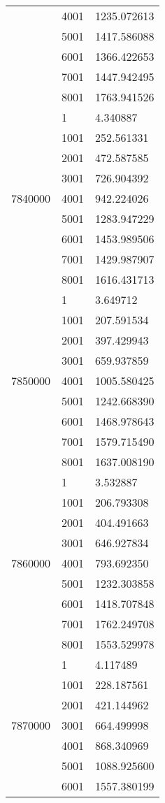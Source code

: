 \begin{table}[htb!]
\begin{tabular}{lll}
 & 4001 & 1235.072613 \\
 & 5001 & 1417.586088 \\
 & 6001 & 1366.422653 \\
 & 7001 & 1447.942495 \\
 & 8001 & 1763.941526 \\
\multirow[c]{9}{*}{7840000} & 1 & 4.340887 \\
 & 1001 & 252.561331 \\
 & 2001 & 472.587585 \\
 & 3001 & 726.904392 \\
 & 4001 & 942.224026 \\
 & 5001 & 1283.947229 \\
 & 6001 & 1453.989506 \\
 & 7001 & 1429.987907 \\
 & 8001 & 1616.431713 \\
\multirow[c]{9}{*}{7850000} & 1 & 3.649712 \\
 & 1001 & 207.591534 \\
 & 2001 & 397.429943 \\
 & 3001 & 659.937859 \\
 & 4001 & 1005.580425 \\
 & 5001 & 1242.668390 \\
 & 6001 & 1468.978643 \\
 & 7001 & 1579.715490 \\
 & 8001 & 1637.008190 \\
\multirow[c]{9}{*}{7860000} & 1 & 3.532887 \\
 & 1001 & 206.793308 \\
 & 2001 & 404.491663 \\
 & 3001 & 646.927834 \\
 & 4001 & 793.692350 \\
 & 5001 & 1232.303858 \\
 & 6001 & 1418.707848 \\
 & 7001 & 1762.249708 \\
 & 8001 & 1553.529978 \\
\multirow[c]{9}{*}{7870000} & 1 & 4.117489 \\
 & 1001 & 228.187561 \\
 & 2001 & 421.144962 \\
 & 3001 & 664.499998 \\
 & 4001 & 868.340969 \\
 & 5001 & 1088.925600 \\
 & 6001 & 1557.380199 \\

\end{tabular}
\end{table}

